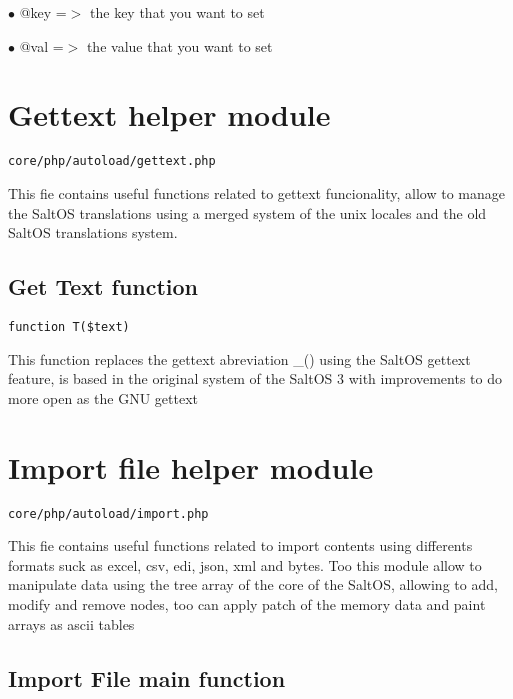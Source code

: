 \documentclass[a4paper]{book}
\begin{document}
\begin{compactitem}
\item[\color{myblue}$\bullet$] @key =$>$ the key that you want to set
\item[\color{myblue}$\bullet$] @val =$>$ the value that you want to set
\end{compactitem}

\hypertarget{toc139}{}
\section{Gettext helper module}

\begin{lstlisting}
core/php/autoload/gettext.php
\end{lstlisting}

This fie contains useful functions related to gettext funcionality, allow to manage the
SaltOS translations using a merged system of the unix locales and the old SaltOS translations
system.

\hypertarget{toc140}{}
\subsection{Get Text function}

\begin{lstlisting}
function T($text)
\end{lstlisting}

This function replaces the gettext abreviation \_() using the SaltOS gettext
feature, is based in the original system of the SaltOS 3 with improvements
to do more open as the GNU gettext

\hypertarget{toc141}{}
\section{Import file helper module}

\begin{lstlisting}
core/php/autoload/import.php
\end{lstlisting}

This fie contains useful functions related to import contents using differents formats suck as
excel, csv, edi, json, xml and bytes. Too this module allow to manipulate data using the tree
array of the core of the SaltOS, allowing to add, modify and remove nodes, too can apply patch
of the memory data and paint arrays as ascii tables

\hypertarget{toc142}{}
\subsection{Import File main function}
\end{document}
